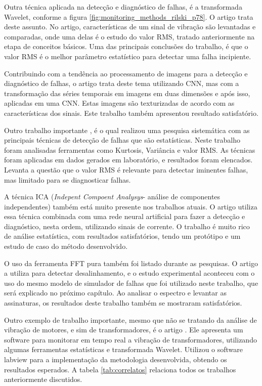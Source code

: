 Outra técnica aplicada na detecção e diagnóstico de falhas, é a transformada Wavelet, conforme a figura \ref{fig:monitoring_methods_rilski_p78}.
O artigo \cite{Hemmati2016a} trata deste assunto. No artigo, características de um sinal de vibração são levantadas e comparadas,
onde uma delas é o estudo do valor RMS, tratado anteriormente na etapa de conceitos básicos. Uma das principais conclusões do trabalho, é que o 
valor RMS é o melhor parâmetro estatístico para detectar uma falha incipiente.

Contribuindo com a tendência ao processamento de imagens para a detecção e diagnóstico de falhas, o artigo \cite{Hatami2017} trata deste tema
utilizando CNN, mas com a transformação das séries temporais em imagens em duas dimensões e após isso, aplicadas em uma CNN. Estas imagens são
texturizadas de acordo com as características dos sinais. Este trabalho também apresentou resultado satisfatório.

Outro trabalho importante \cite{Caesarendra2017} , é o qual realizou uma pesquisa sistemática com as principais técnicas de detecção de 
falhas que são estatísticas. Neste trabalho foram analisadas ferramentas como Kurtosis, Variância e valor RMS. As técnicas foram aplicadas em 
dados gerados em laboratório, e resultados foram elencados. Levanta a questão que o valor RMS é relevante para detectar iminentes falhas, mas
limitado para se diagnosticar falhas.

A técnica ICA (\textit{Indepent Compoent Analysys}- análise de componentes independentes) também está muito presente nos trabalhos atuais. O 
artigo \cite{Garcia-Bracamonte2019} utiliza essa técnica combinada com uma rede neural artificial para fazer a detecção e diagnóstico, 
nesta ordem, utilizando sinais de corrente. O trabalho é muito rico de análise estatística, com resultados satisfatórios, tendo
um protótipo e um estudo de caso do método desenvolvido.

O uso da ferramenta FFT pura também foi listado durante as pesquisas. O artigo \cite{Azeem2019} a utiliza para detectar desalinhamento, e o
estudo experimental aconteceu com o uso do mesmo modelo de simulador de falhas que foi utilizado neste trabalho, que será explicado no próximo
capítulo. Ao analisar o espectro e levantar as assinaturas, os resultados deste trabalho também se mostraram satisfatórios. 

Outro exemplo de trabalho importante, mesmo que não se tratando da análise de vibração de motores, e sim de transformadores, é o artigo \cite{Zhang2019}.
Ele apresenta um software para monitorar em tempo real a vibração de transformadores, utilizando algumas ferramentas estatísticas e transformada
Wavelet. Utilizou o software labview para a implementação da metodologia desenvolvida, obtendo os resultados esperados. A tabela
\ref{tab:correlatos} relaciona todos os trabalhos anteriormente discutidos.

